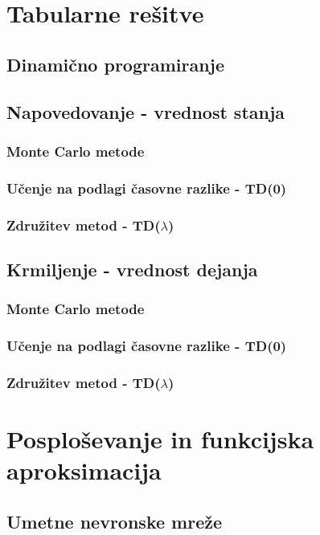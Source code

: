 \documentclass[a4paper, oneside, 12pt]{report}
\begin{document}
\chapter{Tabularne rešitve}
\thispagestyle{fancy}
\section{Dinamično programiranje}
\section{Napovedovanje - vrednost stanja}
\subsection{Monte Carlo metode}
\subsection{Učenje na podlagi časovne razlike - TD(0)} \label{subsection:TD0Prediction}
\subsection{Združitev metod - TD($\lambda$)}
\section{Krmiljenje - vrednost dejanja}
\subsection{Monte Carlo metode}
\subsection{Učenje na podlagi časovne razlike - TD(0)} \label{subsection:TD0Control}
\subsection{Združitev metod - TD($\lambda$)}

\chapter{Posploševanje in funkcijska aproksimacija}
\thispagestyle{fancy}
\section{Umetne nevronske mreže} %
\end{document}
